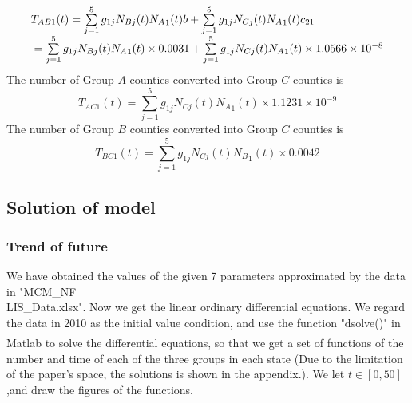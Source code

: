 \documentclass{mcmthesis}
\newcommand{\upcite}[1]{\textsuperscript{\textsuperscript{\cite{#1}}}}
\begin{document}
 \begin{equation}\begin{array}{l}
{T_{AB1}}(t) = \sum\limits_{j = 1}^5 {{g_{1j}}{N_{Bj}}(t){N_A}_1(t)} b + \sum\limits_{j = 1}^5 {{g_{1j}}{N_{Cj}}(t)} {N_A}_1(t){c_{21}}\\
{\rm{          }} = \sum\limits_{j = 1}^5 {{g_{1j}}{N_{Bj}}(t){N_A}_1(t)}  \times 0.0031 + \sum\limits_{j = 1}^5 {{g_{1j}}{N_{Cj}}(t)} {N_A}_1(t) \times 1.0566 \times {10^{ - 8}}
\end{array} \end{equation}
The number of Group $A$ counties converted into Group $C$ counties is  
 \begin{equation}{T_{AC1}}(t) = \sum\limits_{j = 1}^5 {{g_{1j}}{N_{Cj}}(t)} {N_A}_1(t) \times 1.1231 \times {10^{ - 9}} \end{equation}
The number of Group $B$ counties converted into Group $C$ counties is  
 \begin{equation}{T_{BC1}}(t) = \sum\limits_{j = 1}^5 {{g_{1j}}{N_{Cj}}(t)} {N_B}_1(t) \times 0.0042 \end{equation}
 
\subsection{Solution of model}
\subsubsection{Trend of future}
We have obtained the values of the given 7 parameters approximated by the data in "MCM\_NF\\LIS\_Data.xlsx". Now we get the linear ordinary differential equations. We regard the data in 2010 as the initial value condition, and use the function "dsolve()" in Matlab\upcite{higham2016matlab} to solve the differential equations, so that we get a set of functions of the number and time of each of the three groups in each state (Due to the limitation of the paper’s space, the solutions is shown in the appendix.). We let $t\in [0,50]$ ,and draw the figures of the functions.
\end{document}
